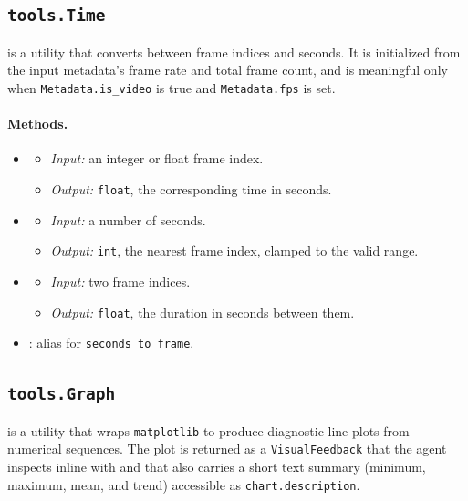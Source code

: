 \subsection{\texttt{tools.Time}}
\label{app:tool_time}
 is a utility that converts between frame indices and seconds. It is initialized from the input metadata's frame rate and total frame count, and is meaningful only when \texttt{Metadata.is\_video} is true and \texttt{Metadata.fps} is set.

\paragraph{Methods.}
\begin{itemize}[leftmargin=1.5em]
\item {}
  \begin{itemize}
  \item \emph{Input:} an integer or float frame index.
  \item \emph{Output:} \texttt{float}, the corresponding time in seconds.
  \end{itemize}
\item {}
  \begin{itemize}
  \item \emph{Input:} a number of seconds.
  \item \emph{Output:} \texttt{int}, the nearest frame index, clamped to the valid range.
  \end{itemize}
\item {}
  \begin{itemize}
  \item \emph{Input:} two frame indices.
  \item \emph{Output:} \texttt{float}, the duration in seconds between them.
  \end{itemize}
\item {}: alias for \texttt{seconds\_to\_frame}.
\end{itemize}

\subsection{\texttt{tools.Graph}}
\label{app:tool_graph}
 is a utility that wraps \texttt{matplotlib} to produce diagnostic line plots from numerical sequences. The plot is returned as a \texttt{VisualFeedback} that the agent inspects inline with  and that also carries a short text summary (minimum, maximum, mean, and trend) accessible as \texttt{chart.description}.

